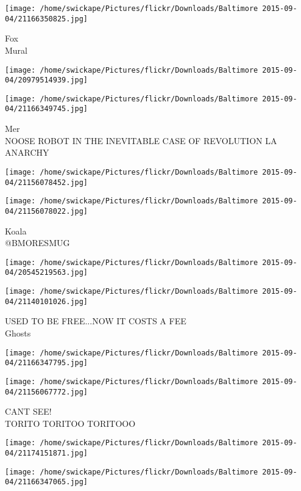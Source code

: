 \documentclass[10pt,letterpaper]{article}
\begin{document}
\vspace{0.25in}
\texttt{[image: /home/swickape/Pictures/flickr/Downloads/Baltimore 2015-09-04/21166350825.jpg]}

Fox\\
Mural
\pagebreak

\texttt{[image: /home/swickape/Pictures/flickr/Downloads/Baltimore 2015-09-04/20979514939.jpg]}

\vspace{0.25in}
\texttt{[image: /home/swickape/Pictures/flickr/Downloads/Baltimore 2015-09-04/21166349745.jpg]}

Mer\\
NOOSE ROBOT IN THE INEVITABLE CASE OF REVOLUTION LA ANARCHY
\pagebreak

\texttt{[image: /home/swickape/Pictures/flickr/Downloads/Baltimore 2015-09-04/21156078452.jpg]}

\vspace{0.25in}
\texttt{[image: /home/swickape/Pictures/flickr/Downloads/Baltimore 2015-09-04/21156078022.jpg]}

Koala\\
@BMORESMUG
\pagebreak

\texttt{[image: /home/swickape/Pictures/flickr/Downloads/Baltimore 2015-09-04/20545219563.jpg]}

\vspace{0.25in}
\texttt{[image: /home/swickape/Pictures/flickr/Downloads/Baltimore 2015-09-04/21140101026.jpg]}

USED TO BE FREE...NOW IT COSTS A FEE\\
Ghosts
\pagebreak

\texttt{[image: /home/swickape/Pictures/flickr/Downloads/Baltimore 2015-09-04/21166347795.jpg]}

\vspace{0.25in}
\texttt{[image: /home/swickape/Pictures/flickr/Downloads/Baltimore 2015-09-04/21156067772.jpg]}

CANT SEE!\\
TORITO TORITOO TORITOOO
\pagebreak

\texttt{[image: /home/swickape/Pictures/flickr/Downloads/Baltimore 2015-09-04/21174151871.jpg]}

\vspace{0.25in}
\texttt{[image: /home/swickape/Pictures/flickr/Downloads/Baltimore 2015-09-04/21166347065.jpg]}
\end{document}
